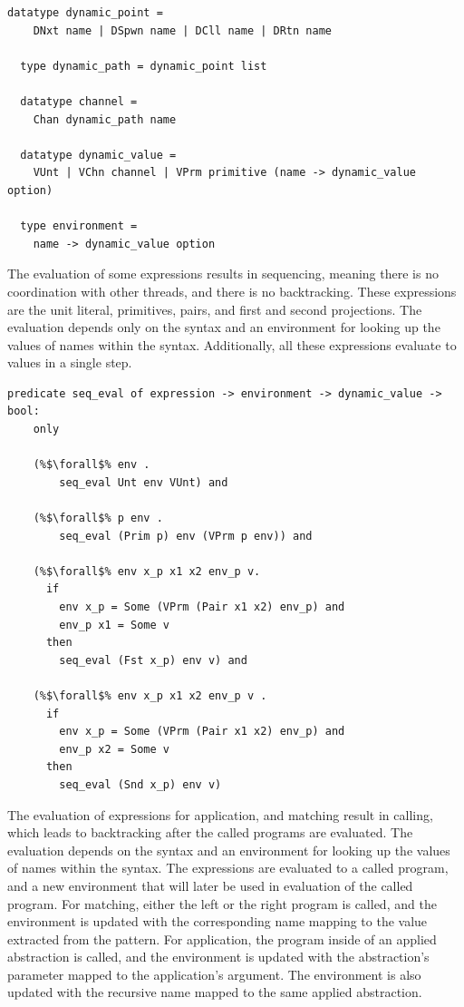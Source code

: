 \documentclass{article}
\begin{document}
\begin{lstlisting}[language=logic, escapechar=\%]
  datatype dynamic_point =
    DNxt name | DSpwn name | DCll name | DRtn name 

  type dynamic_path = dynamic_point list

  datatype channel =
    Chan dynamic_path name 

  datatype dynamic_value = 
    VUnt | VChn channel | VPrm primitive (name -> dynamic_value option)

  type environment =
    name -> dynamic_value option
  \end{lstlisting}

The evaluation of some expressions results in sequencing, meaning there is no coordination
with other threads, and there is no backtracking. These expressions are the
unit literal, primitives, pairs, and first and second projections. The evaluation depends only
on the syntax and an environment for looking up the values of names within the syntax.
Additionally, all these expressions evaluate to values in a single step.

\begin{lstlisting}[language=logic, escapechar=\%]
  predicate seq_eval of expression -> environment -> dynamic_value -> bool:
    only

    (%$\forall$% env . 
        seq_eval Unt env VUnt) and
        
    (%$\forall$% p env .
        seq_eval (Prim p) env (VPrm p env)) and

    (%$\forall$% env x_p x1 x2 env_p v. 
      if
        env x_p = Some (VPrm (Pair x1 x2) env_p) and
        env_p x1 = Some v
      then
        seq_eval (Fst x_p) env v) and

    (%$\forall$% env x_p x1 x2 env_p v . 
      if
        env x_p = Some (VPrm (Pair x1 x2) env_p) and 
        env_p x2 = Some v 
      then
        seq_eval (Snd x_p) env v)
  \end{lstlisting}

The evaluation of expressions for application, and matching result in calling, which leads to
backtracking after the called programs are evaluated. The evaluation depends on the syntax
and an environment for looking up the values of names within the syntax.
The expressions are evaluated to a called program, and a new environment that will
later be used in evaluation of the called program. For matching, either the left or the right
program is called, and the environment is updated with the corresponding name mapping to the
value extracted from the pattern. For application, the program inside of an applied abstraction
is called, and the environment is updated with the abstraction's parameter mapped to the
application's argument. The environment is also updated with the recursive name mapped to the
same applied abstraction.
\end{document}
